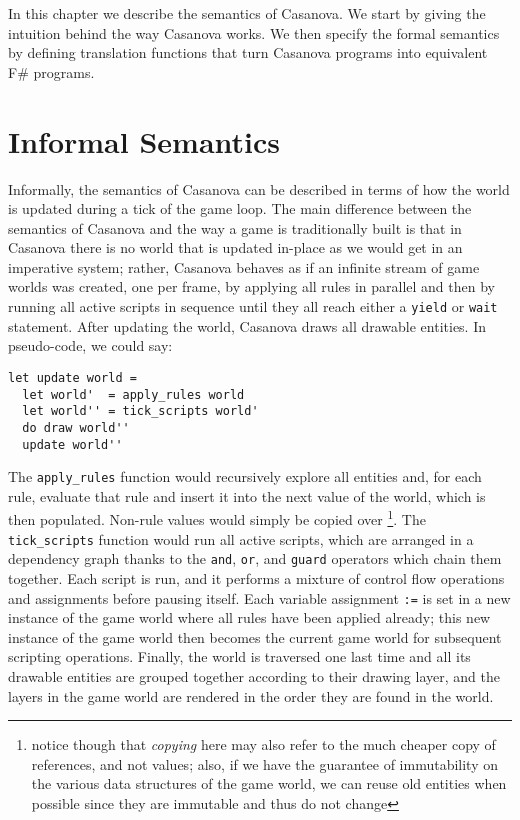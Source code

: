 In this chapter we describe the semantics of Casanova. We start by giving the intuition behind the way Casanova works. We then specify the formal semantics by defining translation functions that turn Casanova programs into equivalent F\# programs. 

\section{Informal Semantics}
Informally, the semantics of Casanova can be described in terms of how the world is updated during a tick of the game loop. The main difference between the semantics of Casanova and the way a game is traditionally built is that in Casanova there is no world that is updated in-place as we would get in an imperative system; rather, Casanova behaves as if an infinite stream of game worlds was created, one per frame, by applying all rules in parallel and then by running all active scripts in sequence until they all reach either a \texttt{yield} or \texttt{wait} statement. After updating the world, Casanova draws all drawable entities. In pseudo-code, we could say:
\begin{lstlisting}
let update world =
  let world'  = apply_rules world
  let world'' = tick_scripts world'
  do draw world''
  update world''
\end{lstlisting}

The \texttt{apply\_rules} function would recursively explore all entities and, for each rule, evaluate that rule and insert it into the next value of the world, which is then populated. Non-rule values would simply be copied over \footnote{notice though that \textit{copying} here may also refer to the much cheaper copy of references, and not values; also, if we have the guarantee of immutability on the various data structures of the game world, we can reuse old entities when possible since they are immutable and thus do not change}. The \texttt{tick\_scripts} function would run all active scripts, which are arranged in a dependency graph thanks to the \texttt{and}, \texttt{or}, and \texttt{guard} operators which chain them together. Each script is run, and it performs a mixture of control flow operations and assignments before pausing itself. Each variable assignment \texttt{:=} is set in a new instance of the game world where all rules have been applied already; this new instance of the game world then becomes the current game world for subsequent scripting operations. Finally, the world is traversed one last time and all its drawable entities are grouped together according to their drawing layer, and the layers in the game world are rendered in the order they are found in the world.

